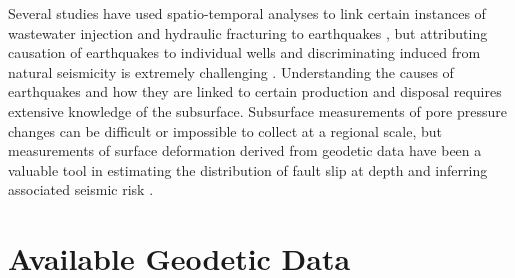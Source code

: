 
Several studies have used spatio-temporal analyses to link certain instances of wastewater injection and hydraulic fracturing to earthquakes \citep{Savvaidis2020InducedSeismicityDelaware, Skoumal2020InducedSeismicityDelaware, Grigoratos2020EarthquakesInducedWastewatera}, but attributing causation of earthquakes to individual wells and discriminating induced from natural seismicity is extremely challenging \citep{Grigoli2017CurrentChallengesMonitoring, Dahm2012RecommendationDiscriminationHuman, Verdon2019ImprovedFrameworkDiscriminating,Frohlich2016HistoricalReviewInduced, Frohlich2016ReplyCommentA}.
Understanding the causes of earthquakes and how they are linked to certain production and disposal requires extensive knowledge of the subsurface.
Subsurface measurements of pore pressure changes can be difficult or impossible to collect at a regional scale, but measurements of surface deformation derived from geodetic data have been a valuable tool in estimating the distribution of fault slip at depth and inferring associated seismic risk \citep{Segall2010EarthquakeVolcanoDeformation, Huang2017FaultGeometryInversion}.


\section{Available Geodetic Data}
\label{sec:ch3-geodetic-data}

%






